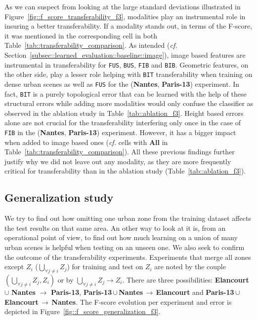         As we can suspect from looking at the large standard deviations illustrated in Figure~\ref{fig::f_score_transferability_f3}, modalities play an instrumental role in insuring a better transferability.
        If a modality stands out, in terms of the F-score, it was mentioned in the corresponding cell in both Table~\ref{tab::transferability_comparison}.
        As intended (\textit{cf.} Section~\ref{subsec::learned_evaluation::baseline::image}), image based features are instrumental in transferability for \texttt{FUS}, \texttt{BUS}, \texttt{FIB} and \texttt{BIB}.
        Geometric features, on the other side, play a lesser role helping with \texttt{BIT} transferability when training on dense urban scenes as well as \texttt{FUS} for the (\textbf{Nantes}, \textbf{Paris-13}) experiment.
        In fact, \texttt{BIT} is a purely topological error that can be learned with the help of these structural errors while adding more modalities would only confuse the classifier as observed in the ablation study in Table~\ref{tab::ablation_f3}.
        Height based errors alone are not crucial for the transferability interfering only once in the case of \texttt{FIB} in the (\textbf{Nantes}, \textbf{Paris-13}) experiment.
        However, it has a bigger impact when added to image based ones (\textit{cf.} cells with \textbf{All} in Table~\ref{tab::transferability_comparison}).
        All these previous findings further justify why we did not leave out any modality, as they are more frequently critical for transferability than in the ablation study (Table~\ref{tab::ablation_f3}).\\

    \subsection{Generalization study}
        \label{subsec::more_experiments::scalability::generalization}
        We try to find out how omitting one urban zone from the training dataset affects the test results on that same area.
        An other way to look at it is, from an operational point of view, to find out how much learning on a union of many urban scenes is helpful when testing on an unseen one.
        We also seek to confirm the outcome of the transferability experiments.
        Experiments that merge all zones except $Z_i$ ($\underset{\forall j \neq i}{\bigcup} Z_j$) for training and test on $Z_i$ are noted by the couple $(\underset{\forall j \neq i}{\bigcup} Z_j, Z_i)$ or by $ \underset{\forall j \neq i}{\bigcup} Z_j \rightarrow Z_i$.
        There are three possibilities: \textbf{Elancourt} $\cup$ \textbf{Nantes} \(\rightarrow\) \textbf{Paris-13}, \mbox{\textbf{Paris-13}}\,$\cup$\,\textbf{Nantes}\,\(\rightarrow\)\,\textbf{Elancourt} and \mbox{\textbf{Paris-13}}\,$\cup$\,\textbf{Elancourt}\,\(\rightarrow\)\,\textbf{Nantes}.
        The F-score evolution per experiment and error is depicted in Figure~\ref{fig::f_score_generalization_f3}.\\
    
